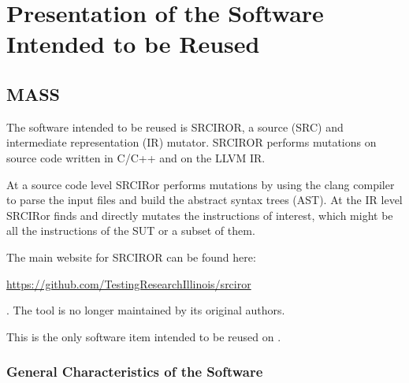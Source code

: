 
\chapter{Presentation of the Software Intended to be Reused}

\section{MASS}
\label{sec:mass:reuse}

The software intended to be reused is SRCIROR, a source (SRC) and intermediate representation (IR) mutator. SRCIROR performs mutations on source code written in C/C++ and on the LLVM IR.

At a source code level SRCIRor performs mutations by using the clang compiler to parse the input files and build the abstract syntax trees (AST). At the IR level SRCIRor finds and directly mutates the instructions of interest, which might be all the instructions of the SUT or a subset of them.

The main website for SRCIROR can be found here: \begin{scriptsize}\url{https://github.com/TestingResearchIllinois/srciror}\end{scriptsize}. The tool is no longer maintained by its original authors.

This is the only software item intended to be reused on \MASS.

\subsection{General Characteristics of the Software}

